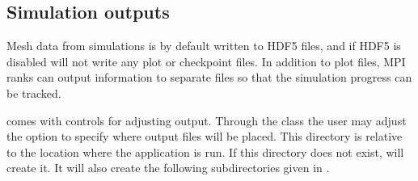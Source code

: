 \documentclass[letterpaper,10pt,english]{sphinxmanual}
\begin{document}
\subsection{Simulation outputs}
\label{\detokenize{Base/Control:simulation-outputs}}
\sphinxAtStartPar
Mesh data from  simulations is by default written to HDF5 files, and if HDF5 is disabled  will not write any plot or checkpoint files.
In addition to plot files, MPI ranks can output information to separate files so that the simulation progress can be tracked.

\sphinxAtStartPar
{} comes with controls for adjusting output.
Through the {\hyperref[\detokenize{Source/Driver:chap-driver}]{}} class the user may adjust the option  to specify where output files will be placed.
This directory is relative to the location where the application is run.
If this directory does not exist,  will create it.
It will also create the following subdirectories given in {\hyperref[\detokenize{Base/Control:tab-outputdirectories}]{}}.
\end{document}
